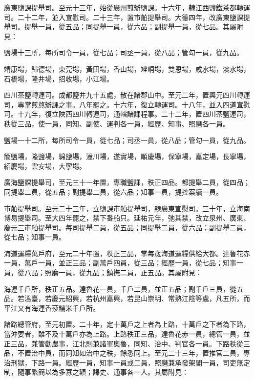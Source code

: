 \begin{pinyinscope}
 廣東鹽課提舉司。至元十三年，始從廣州煎辦鹽課。十六年，隸江西鹽鐵茶都轉運司。二十二年，並入宣慰司。二十三年，置市舶提舉司。大德四年，改廣東鹽課提舉司。提舉一員，從五品；同提舉一員，從六品；副提舉一員，從七品。其屬附見：



 鹽場十三所，每所司令一員，從七品；司丞一員，從八品；管勾一員，從九品。



 靖康場，歸德場，東莞場，黃田場，香山場，矬峒場，雙恩場，咸水場，淡水場，石橋場，隆井場，招收場，小江場。



 四川茶鹽轉運司。成都鹽井九十五處，散在諸郡山中。至元二年，置興元四川轉運司，專掌煎熬辦課之事。八年罷之。十六年，復立轉運司。十八年，並入四道宣慰司。十九年，復立陜西四川轉運司，通轄諸課程事。二十二年，置四川茶鹽運司，秩從三品，使一員，同知、副使、運判各一員，經歷、知事、照磨各一員。



 鹽場一十二所，每所司令一員，從七品；司丞一員，從八品；管勾一員，從九品。



 簡鹽場，隆鹽場，綿鹽場，潼川場，遂實場，順慶場，保寧場，嘉定場，長寧場，紹慶場，雲安場，大寧場。



 廣海鹽課提舉司，至元三十一年置，專職鹽課，秩正四品。都提舉二員，從四品；同提舉二員，從五品；副提舉二員，從六品；知事一員，提控案牘一員。



 市舶提舉司。至元二十三年，立鹽課市舶提舉司，隸廣東宣慰司。三十年，立海南博易提舉司。至大四年罷之，禁下番船只。延祐元年，弛其禁，改立泉州、廣東、慶元三市舶提舉司。每司提舉二員，從五品；同提舉二員，從六品；副提舉二員，從七品；知事一員。



 海道運糧萬戶府，至元二十年置，秩正三品，掌每歲海道運糧供給大都。達魯花赤一員，萬戶一員，並正三品；副萬戶四員，從三品；經歷一員，從七品；知事一員，從八品；照磨一員，從九品；鎮撫二員，正五品。其屬附見：



 海運千戶所，秩正五品。達魯花一員，千戶二員，並正五品；副千戶三員，從五品。若溫臺，若慶元紹興，若杭州嘉興，若昆山崇明、常熟江陰等處，凡五所，而平江又有海運香莎糯米千戶所。



 諸路總管府，至元初置。二十年，定十萬戶之上者為上路，十萬戶之下者為下路，當沖要者，雖不及十萬戶亦為上路。上路秩正三品，達魯花赤一員，總管一員，並正三品，兼管勸農事，江北則兼諸軍奧魯，同知、治中、判官各一員。下路秩從三品，不置治中員，而同知如治中之秩，餘悉同上。至元二十三年，置推官二員，專治刑獄，下路一員。經歷一員，知事一員或二員，照磨兼承發架閣一員，司吏無定制，隨事繁簡以為多寡之額；譯史、通事各一人。其屬附見：




\end{pinyinscope}
